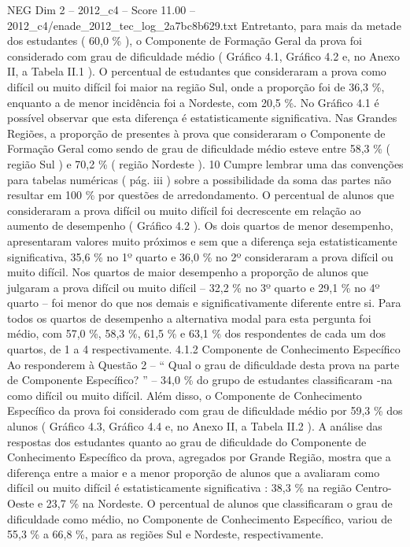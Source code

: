 \begin{textsample}{NEG Dim 2 – 2012\_c4 – Score 11.00 – 2012\_c4/enade\_2012\_tec\_log\_2a7bc8b629.txt}
Entretanto, para mais da metade dos estudantes ( 60,0 \% ), o Componente de Formação Geral da prova foi considerado com grau de dificuldade médio ( Gráfico 4.1, Gráfico 4.2 e, no Anexo II, a Tabela II.1 ).
O percentual de estudantes que consideraram a prova como difícil ou muito difícil foi maior na região Sul, onde a proporção foi de 36,3 \%, enquanto a de menor incidência foi a Nordeste, com 20,5 \%.
No Gráfico 4.1 é possível observar que esta diferença é estatisticamente significativa.
Nas Grandes Regiões, a proporção de presentes à prova que consideraram o Componente de Formação Geral como sendo de grau de dificuldade médio esteve entre 58,3 \% ( região Sul ) e 70,2 \% ( região Nordeste ). 10 Cumpre lembrar uma das convenções para tabelas numéricas ( pág. iii ) sobre a possibilidade da soma das partes não resultar em 100 \% por questões de arredondamento.
O percentual de alunos que consideraram a prova difícil ou muito difícil foi decrescente em relação ao aumento de desempenho ( Gráfico 4.2 ).
Os dois quartos de menor desempenho, apresentaram valores muito próximos e sem que a diferença seja estatisticamente significativa, 35,6 \% no 1º quarto e 36,0 \% no 2º consideraram a prova difícil ou muito difícil.
Nos quartos de maior desempenho a proporção de alunos que julgaram a prova difícil ou muito difícil – 32,2 \% no 3º quarto e 29,1 \% no 4º quarto – foi menor do que nos demais e significativamente diferente entre si.
Para todos os quartos de desempenho a alternativa modal para esta pergunta foi médio, com 57,0 \%, 58,3 \%, 61,5 \% e 63,1 \% dos respondentes de cada um dos quartos, de 1 a 4 respectivamente. 4.1.2 Componente de Conhecimento Específico Ao responderem à Questão 2 – “ Qual o grau de dificuldade desta prova na parte de Componente Específico? ” – 34,0 \% do grupo de estudantes classificaram -na como difícil ou muito difícil.
Além disso, o Componente de Conhecimento Específico da prova foi considerado com grau de dificuldade médio por 59,3 \% dos alunos ( Gráfico 4.3, Gráfico 4.4 e, no Anexo II, a Tabela II.2 ).
A análise das respostas dos estudantes quanto ao grau de dificuldade do Componente de Conhecimento Específico da prova, agregados por Grande Região, mostra que a diferença entre a maior e a menor proporção de alunos que a avaliaram como difícil ou muito difícil é estatisticamente significativa : 38,3 \% na região Centro-Oeste e 23,7 \% na Nordeste.
O percentual de alunos que classificaram o grau de dificuldade como médio, no Componente de Conhecimento Específico, variou de 55,3 \% a 66,8 \%, para as regiões Sul e Nordeste, respectivamente.

\end{textsample}

